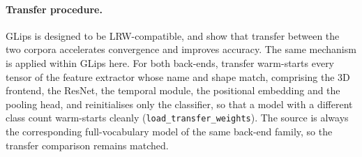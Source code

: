 \documentclass[10pt, a4paper]{article}
\begin{document}
\paragraph{Transfer procedure.}
\label{sec:transfer}
GLips is designed to be LRW-compatible, and \citet{schwiebert2022glips} show that transfer between the two corpora accelerates convergence and improves accuracy. The same mechanism is applied within GLips here. For both back-ends, transfer warm-starts every tensor of the feature extractor whose name and shape match, comprising the 3D frontend, the ResNet, the temporal module, the positional embedding and the pooling head, and reinitialises only the classifier, so that a model with a different class count warm-starts cleanly (\texttt{load\_transfer\_weights}). The source is always the corresponding full-vocabulary model of the same back-end family, so the transfer comparison remains matched.
\end{document}
